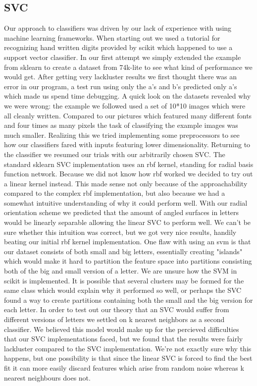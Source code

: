 \documentclass[paper=a4, fontsize=11pt]{scrartcl} %
\numberwithin{equation}{section} %
\numberwithin{figure}{section} %
\numberwithin{table}{section} %
\begin{document}
\subsection{SVC}
Our approach to classifiers was driven by our lack of experience with using machine learning frameworks.
When starting out we used a tutorial for recognizing hand written digits provided by scikit which happened to use a support vector classifier. %
In our first attempt we simply extended the example from sklearn to create a dataset from 74k-lite to see what kind of performance we would get.
After getting very lackluster results we first thought there was an error in our program, a test run using only the a's and b's predicted only a's which made us spend time debugging.
A quick look on the datasets revealed why we were wrong: the example we followed used a set of 10*10 images which were all cleanly written. 
Compared to our pictures which featured many different fonts and four times as many pixels the task of classifying the example images was much smaller.
Realizing this we tried implementing some preprocessors to see how our classifiers fared with inputs featuring lower dimensionality.
Returning to the classifier we resumed our trials with our arbitrarily chosen SVC.
The standard sklearn SVC implementation uses an rbf kernel, standing for radial basis function network.
Because we did not know how rbf worked we decided to try out a linear kernel instead.
This made sense not only because of the approachability compared to the complex rbf implementation, but also because we had a somewhat intuitive understanding of why it could perform well.
With our radial orientation scheme we predicted that the amount of angled surfaces in letters would be linearly separable allowing the linear SVC to perform well.
We can't be sure whether this intuition was correct, but we got very nice results, handily beating our initial rbf kernel implementation.
One flaw with using an svm is that our dataset consists of both small and big letters, essentially creating "islands" which would make it hard to partition the feature space into partitions consisting both of the big and small version of a letter.
We are unsure how the SVM in scikit is implemented. 
It is possible that several clusters may be formed for the same class which would explain why it performed so well, or perhaps the SVC found a way to create partitions containing both the small and the big version for each letter.
In order to test out our theory that an SVC would suffer from different versions of letters we settled on k nearest neighbors as a second classifier.
We believed this model would make up for the percieved difficulties that our SVC implementations faced, but we found that the results were fairly lackluster compared to the SVC implementation.
We're not exactly sure why this happens, but one possibility is that since the linear SVC is forced to find the best fit it can more easily discard features which arise from random noise whereas k nearest neighbours does not.
\end{document}
